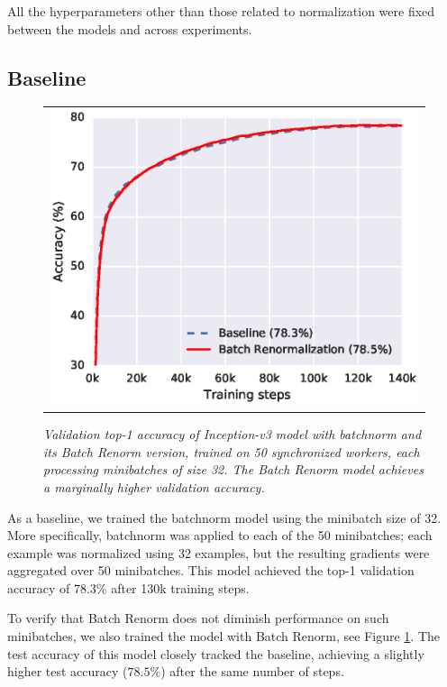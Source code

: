 All the hyperparameters other than those related to normalization were fixed between the models and across experiments.

\subsection{Baseline}

\begin{figure}
    \centering
    \begin{tabular}{@{}c@{}}
\includegraphics[width=\columnwidth]{baseline.eps}
\end{tabular} 

    \caption{\em Validation top-1 accuracy of Inception-v3 model with batchnorm and its Batch Renorm version, trained on 50 synchronized workers, each processing minibatches of size 32. The Batch Renorm model achieves a marginally higher validation accuracy.
    }
    \label{fig-baseline}
\end{figure}

As a baseline, we trained the batchnorm model using the minibatch size of 32. More specifically, batchnorm was applied to each of the 50 minibatches; each example was normalized using 32 examples, but the resulting gradients were aggregated over 50 minibatches. This model achieved the top-1 validation accuracy of $78.3\%$ after 130k training steps.

To verify that Batch Renorm does not diminish performance on such minibatches, we also trained the model with Batch Renorm, see Figure \ref{fig-baseline}. The test accuracy of this model closely tracked the baseline, achieving a slightly higher test accuracy ($78.5\%$) after the same number of steps.

